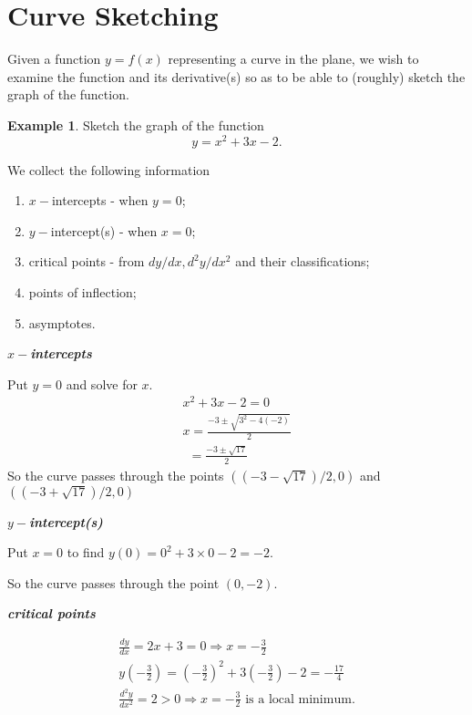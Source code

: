 \documentclass[
  11pt,
  oneside]{book}
\providecommand{\tightlist}{%
  \setlength{\itemsep}{0pt}\setlength{\parskip}{0pt}}
\newcommand{\slide}{}
\theoremstyle{definition}
\theoremstyle{definition}
\newtheorem{example}{Example}[chapter]
\theoremstyle{definition}
\theoremstyle{definition}
\theoremstyle{remark}
\begin{document}
\slide

\section{Curve Sketching}\label{curve-sketching}

Given a function \(y=f(x)\) representing a curve in the plane, we wish to examine the function and its derivative(s) so as to be able to (roughly) sketch the graph of the function.

\begin{example}
Sketch the graph of the function
\[
y = x^2+3x-2.
\]
\end{example}

We collect the following information

\begin{enumerate}
\def\labelenumi{\arabic{enumi}.}
\tightlist
\item
  \(x-\)intercepts - when \(y=0\);
\item
  \(y-\)intercept(s) - when \(x = 0\);
\item
  critical points - from \(dy/dx, d^2y/dx^2\) and their classifications;
\item
  points of inflection;
\item
  asymptotes.
\end{enumerate}

\slide

\textbf{\emph{\(x-\)intercepts}}

Put \(y=0\) and solve for \(x\).
\begin{gather*}
x^2+3x-2 = 0\\
x = \frac{-3\pm\sqrt{3^2-4(-2)}}{2}\\
\ \ =\frac{-3\pm\sqrt{17}}{2}
\end{gather*}
So the curve passes through the points \(((-3-\sqrt{17})/2,0)\) and\(((-3+\sqrt{17})/2,0)\)

\textbf{\emph{\(y-\)intercept(s)}}

Put \(x=0\) to find \(y(0) = 0^2+3\times0-2 = -2\).

So the curve passes through the point \((0,-2)\).

\slide

\textbf{\emph{critical points}}

\begin{gather*}
\frac{dy}{dx} = 2x+3 = 0 \Rightarrow x = -\frac{3}{2}\\
y(-\frac32) = \left(-\frac32\right)^2 +3\left(-\frac 32\right) - 2 = -\frac{17}4\\
\frac{d^2y}{dx^2} = 2>0\Rightarrow x=-\frac 32\text{ is a local minimum}.
\end{gather*}
\end{document}
